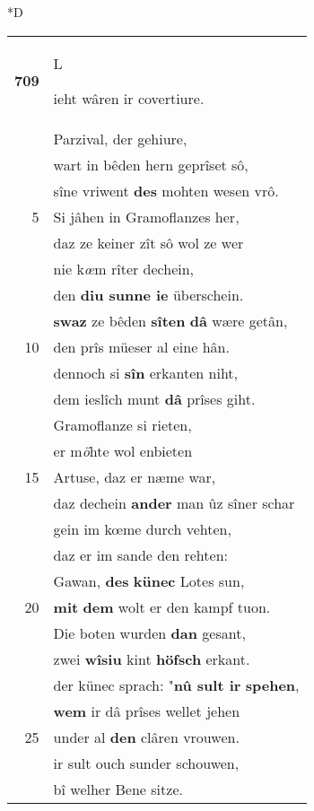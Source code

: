 \documentclass[8pt,a4paper,notitlepage]{article}
\begin{document}
\begin{table}[ht]
\begin{minipage}[t]{0.5\linewidth}
\small
\begin{center}*D
\end{center}
\begin{tabular}{rl}
\textbf{709} & \begin{large}L\end{large}ieht wâren ir covertiure.\\ 
 & Parzival, der gehiure,\\ 
 & wart in bêden hern geprîset sô,\\ 
 & sîne vriwent \textbf{des} mohten wesen vrô.\\ 
5 & Si jâhen in Gramoflanzes her,\\ 
 & daz ze keiner zît sô wol ze wer\\ 
 & nie k\textit{œ}m rîter dechein,\\ 
 & den \textbf{diu sunne ie} überschein.\\ 
 & \textbf{swaz} ze bêden \textbf{sîten} \textbf{dâ} wære getân,\\ 
10 & den prîs müeser al eine hân.\\ 
 & dennoch si \textbf{sîn} erkanten niht,\\ 
 & dem ieslîch munt \textbf{dâ} prîses giht.\\ 
 & Gramoflanze si rieten,\\ 
 & er m\textit{ö}hte wol enbieten\\ 
15 & Artuse, daz er næme war,\\ 
 & daz dechein \textbf{ander} man ûz sîner schar\\ 
 & gein im kœme durch vehten,\\ 
 & daz er im sande den rehten:\\ 
 & Gawan, \textbf{des} \textbf{künec} Lotes sun,\\ 
20 & \textbf{mit} \textbf{dem} wolt er den kampf tuon.\\ 
 & Die boten wurden \textbf{dan} gesant,\\ 
 & zwei \textbf{wîsiu} kint \textbf{höfsch} erkant.\\ 
 & der künec sprach: "\textbf{nû sult ir} \textbf{spehen},\\ 
 & \textbf{wem} ir dâ prîses wellet jehen\\ 
25 & under al \textbf{den} clâren vrouwen.\\ 
 & ir sult ouch sunder schouwen,\\ 
 & bî welher Bene sitze.\\ 

\end{tabular}
\end{minipage}
\end{table}
\end{document}
